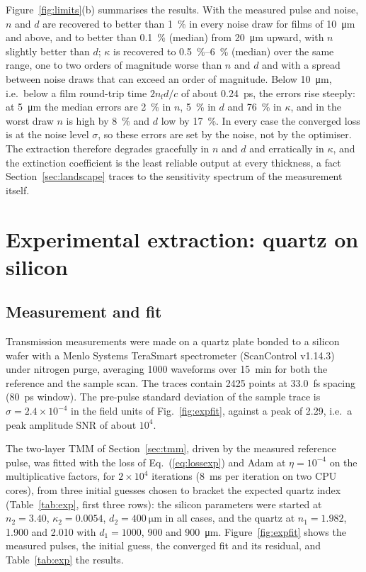 \documentclass{optica-article}
\DeclareRobustCommand{\chg}[1]{{\color{blue}#1}}
\newcommand{\kap}{\kappa}
\begin{document}
\chg{Figure~\ref{fig:limits}(b) summarises the results. With the measured pulse and noise, $n$ and $d$ are recovered to better than \SI{1}{\percent} in every noise draw for films of \SI{10}{\micro\metre} and above, and to better than \SI{0.1}{\percent} (median) from \SI{20}{\micro\metre} upward, with $n$ slightly better than $d$; $\kap$ is recovered to \SIrange{0.5}{6}{\percent} (median) over the same range, one to two orders of magnitude worse than $n$ and $d$ and with a spread between noise draws that can exceed an order of magnitude. Below \SI{10}{\micro\metre}, i.e.\ below a film round-trip time $2n_{\mathrm f}d/c$ of about \SI{0.24}{\pico\second}, the errors rise steeply: at \SI{5}{\micro\metre} the median errors are \SI{2}{\percent} in $n$, \SI{5}{\percent} in $d$ and \SI{76}{\percent} in $\kap$, and in the worst draw $n$ is high by \SI{8}{\percent} and $d$ low by \SI{17}{\percent}. In every case the converged loss is at the noise level $\sigma$, so these errors are set by the noise, not by the optimiser. The extraction therefore degrades gracefully in $n$ and $d$ and erratically in $\kap$, and the extinction coefficient is the least reliable output at every thickness, a fact Section~\ref{sec:landscape} traces to the sensitivity spectrum of the measurement itself.}

\section{Experimental extraction: quartz on silicon}\label{sec:exp}
\subsection{Measurement and fit}
Transmission measurements were made on a quartz plate bonded to a silicon wafer  with a Menlo Systems TeraSmart spectrometer (ScanControl v1.14.3) under nitrogen purge, averaging 1000 waveforms over \SI{15}{\minute} for both the reference and the sample scan. The traces contain 2425 points at \SI{33.0}{\femto\second} spacing (\SI{80}{\pico\second} window). The pre-pulse standard deviation of the sample trace is $\sigma=2.4\times10^{-4}$ in the field units of Fig.~\ref{fig:expfit}, against a peak of 2.29, i.e.\ a peak amplitude SNR of about $10^4$.

The two-layer TMM of Section~\ref{sec:tmm}, driven by the measured reference pulse, was fitted with the loss of Eq.~(\ref{eq:lossexp}) and Adam at $\eta=10^{-4}$ on the multiplicative factors, for $2\times10^4$ iterations (\SI{8}{\milli\second} per iteration on two CPU cores), from three initial guesses chosen to bracket the expected quartz index (Table~\ref{tab:exp}, first three rows): the silicon parameters were started at $n_2=3.40$, $\kap_2=0.0054$, $d_2=\SI{400}{\micro\metre}$ in all cases, and the quartz at $n_1=1.982$, 1.900 and 2.010 with $d_1=1000$, 900 and \SI{900}{\micro\metre}. Figure~\ref{fig:expfit} shows the measured pulses, the initial guess, the converged fit and its residual, and Table~\ref{tab:exp} the results.
\end{document}
